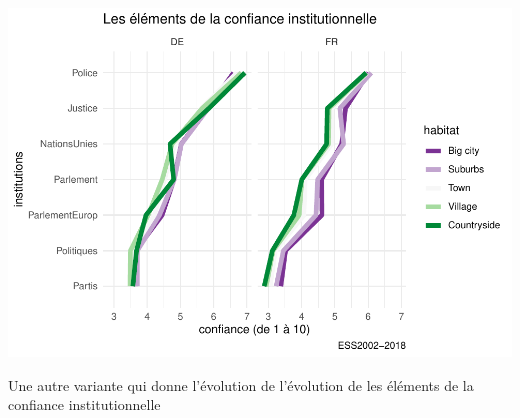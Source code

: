 \documentclass[
]{book}
\begin{document}
\includegraphics{bookdown-demo_files/figure-latex/0501-1.pdf}

Une autre variante qui donne l'évolution de l'évolution de les éléments de la confiance institutionnelle
\end{document}

